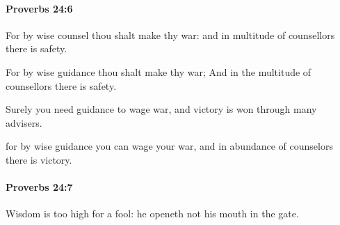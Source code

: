 		\paragraph{Proverbs 24:6} %
			\label{PROVERBS-24-6}

			For by wise counsel thou shalt make thy war: and in multitude of counsellors there is safety.

			\begin{versebox}
					\item[BHS] 
					\item[ASV] For by wise guidance thou shalt make thy war; And in the multitude of counsellors there is safety.
					\item[NIV] Surely you need guidance to wage war, and victory is won through many advisers.
					\item[NRSV] for by wise guidance you can wage your war, and in abundance of counselors there is victory.
			\end{versebox}

		\paragraph{Proverbs 24:7} %
			\label{PROVERBS-24-7}

			Wisdom is too high for a fool: he openeth not his mouth in the gate.

